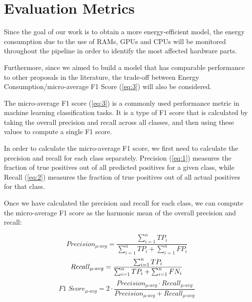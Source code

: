 \section{Evaluation Metrics}
\label{metrics}
Since the goal of our work is to obtain a more energy-efficient model, the energy consumption due to the use of RAMs, GPUs and CPUs will be monitored throughout the pipeline in order to identify the most affected hardware parts.

Furthermore, since we aimed to build a model that has comparable performance to other proposals in the literature, the trade-off between Energy Consumption/micro-average F1 Score (\ref{eq:3}) will also be considered.

The micro-average F1 score (\ref{eq:3}) is a commonly used performance metric in machine learning classification tasks. It is a type of F1 score that is calculated by taking the overall precision and recall across all classes, and then using these values to compute a single F1 score.

In order to calculate the micro-average F1 score, we first need to calculate the precision and recall for each class separately. Precision (\ref{eq:1}) measures the fraction of true positives out of all predicted positives for a given class, while Recall (\ref{eq:2}) measures the fraction of true positives out of all actual positives for that class.

Once we have calculated the precision and recall for each class, we can compute the micro-average F1 score as the harmonic mean of the overall precision and recall:

\begin{equation} \label{eq:1}
Precision_{\mu\text{-}avg} = \frac{\sum_{i=1}^{n} TP_{i}}{\sum_{i=1}^{n} TP_{i} + \sum_{i=1}^{n} FP_{i}}
\end{equation}
\begin{equation} \label{eq:2}
Recall_{\mu\text{-}avg} = \frac{\sum_{i=1}^{n} TP_{i}}{\sum_{i=1}^{n} TP_{i} + \sum_{i=1}^{n} FN_{i}}\\
\end{equation}
\begin{equation} \label{eq:3}
F1\;Score_{\mu\text{-}avg} = 2 \cdot \frac{Precision_{\mu\text{-}avg} \cdot Recall_{\mu\text{-}avg}}{Precision_{\mu\text{-}avg} + Recall_{\mu\text{-}avg}}
\end{equation}